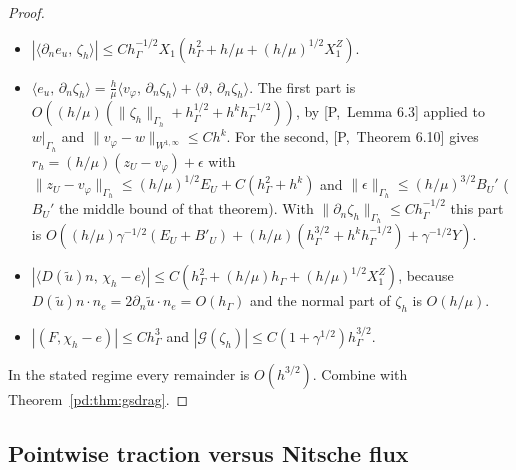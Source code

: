 \documentclass[11pt,reqno]{amsart}
\theoremstyle{plain}
\theoremstyle{definition}
\newcommand{\hG}{h_\Gamma}
\newcommand{\Gh}{\Gamma_h}
\newcommand{\dn}{\partial_n}
\newcommand{\ut}{\tilde u}
\newcommand{\ip}[2]{\langle #1,\, #2\rangle}
\newcommand{\norm}[1]{\lVert #1\rVert}
\newcommand{\Gc}{\mathcal G}
\newcommand{\Pref}[1]{\textup{[P,~#1]}}
\begin{document}
\begin{proof}
\begin{itemize}
\item $|\ip{\dn e_u}{\zeta_h}|\le C\hG^{-1/2}X_1(\hG^2+h/\mu+(h/\mu)^{1/2}X_1^Z)$.
\item $\ip{e_u}{\dn\zeta_h}=\frac h\mu\ip{v_\varphi}{\dn\zeta_h}+\ip\vartheta{\dn\zeta_h}$. The first part is $O((h/\mu)(\norm{\zeta_h}_{\Gh}+\hG^{1/2}+h^k\hG^{-1/2}))$, by \Pref{Lemma 6.3} applied to $w|_{\Gh}$ and $\norm{v_\varphi-w}_{W^{1,\infty}}\le Ch^k$. For the second, \Pref{Theorem 6.10} gives $r_h=(h/\mu)(z_U-v_\varphi)+\epsilon$ with $\norm{z_U-v_\varphi}_{\Gh}\le(h/\mu)^{1/2}E_U+C(\hG^2+h^k)$ and $\norm\epsilon_{\Gh}\le(h/\mu)^{3/2}B_U'$ ($B_U'$ the middle bound of that theorem). With $\norm{\dn\zeta_h}_{\Gh}\le C\hG^{-1/2}$ this part is $O((h/\mu)\gamma^{-1/2}(E_U+B'_U)+(h/\mu)(\hG^{3/2}+h^k\hG^{-1/2})+\gamma^{-1/2}Y)$.
\item $|\ip{D(\ut)n}{\chi_h-e}|\le C(\hG^2+(h/\mu)\hG+(h/\mu)^{1/2}X_1^Z)$, because $D(\ut)n\cdot n_e=2\dn\ut\cdot n_e=O(\hG)$ and the normal part of $\zeta_h$ is $O(h/\mu)$.
\item $|(F,\chi_h-e)|\le C\hG^3$ and $|\Gc(\zeta_h)|\le C(1+\gamma^{1/2})\hG^{3/2}$.
\end{itemize}
In the stated regime every remainder is $O(h^{3/2})$. Combine with Theorem~\ref{pd:thm:gsdrag}.
\end{proof}

\subsection{Pointwise traction versus Nitsche flux}
\end{document}
